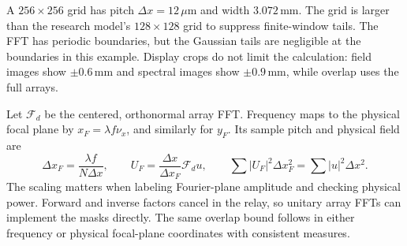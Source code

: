\documentclass[10pt,a4paper]{article}
\newcommand{\F}{\mathcal F}
\begin{document}
A $256\times256$ grid has pitch $\Delta x=12\,\mu$m and width $3.072\,$mm. The grid is larger than the research model's $128\times128$ grid to suppress finite-window tails. The FFT has periodic boundaries, but the Gaussian tails are negligible at the boundaries in this example. Display crops do not limit the calculation: field images show $\pm0.6\,$mm and spectral images show $\pm0.9\,$mm, while overlap uses the full arrays.

Let $\F_d$ be the centered, orthonormal array FFT. Frequency maps to the physical focal plane by $x_F=\lambda f\nu_x$, and similarly for $y_F$. Its sample pitch and physical field are
\begin{equation}
 \Delta x_F=\frac{\lambda f}{N\Delta x},\qquad
 U_F=\frac{\Delta x}{\Delta x_F}\F_d u,\qquad
 \sum |U_F|^2\Delta x_F^2=\sum |u|^2\Delta x^2.
\end{equation}
The scaling matters when labeling Fourier-plane amplitude and checking physical power. Forward and inverse factors cancel in the relay, so unitary array FFTs can implement the masks directly. The same overlap bound follows in either frequency or physical focal-plane coordinates with consistent measures.
\end{document}
